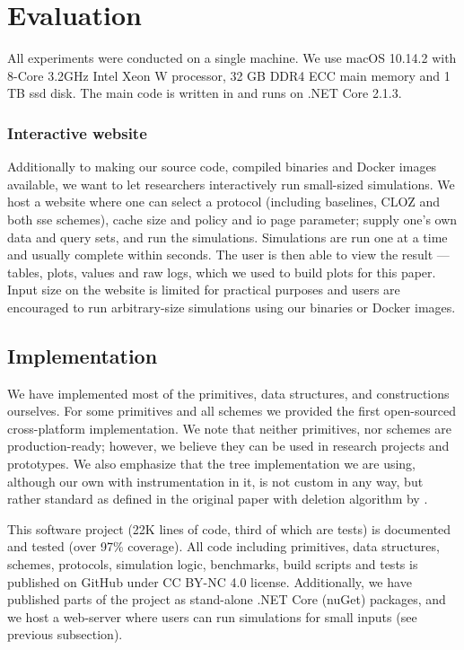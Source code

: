 \section{Evaluation}\label{section:range-snapshot:evaluation}

	All experiments were conducted on a single machine.
	We use macOS 10.14.2 with 8-Core 3.2GHz Intel Xeon W processor, 32 GB DDR4 ECC main memory and 1 TB \acrshort{ssd} disk.
	The main code is written in {\Csharp} and runs on {.NET Core 2.1.3}.

	\subsubsection*{Interactive website}\label{section:range-snapshot:website}

		Additionally to making our source code, compiled binaries and Docker images available, we want to let researchers interactively run small-sized simulations.
		We host a website \cite{ore-website} where one can select a protocol (including baselines, CLOZ and both \acrshort{sse} schemes), cache size and policy and \acrshort{io} page parameter; supply one's own data and query sets, and run the simulations.
		Simulations are run one at a time and usually complete within seconds.
		The user is then able to view the result --- tables, plots, values and raw logs, which we used to build plots for this paper.
		Input size on the website is limited for practical purposes and users are encouraged to run arbitrary-size simulations using our binaries or Docker images.

	\subsection{Implementation}

		We have implemented most of the primitives, data structures, and constructions ourselves.
		For some primitives and all schemes we provided the first open-sourced cross-platform {\Csharp} implementation.
		We note that neither primitives, nor schemes are production-ready; however, we believe they can be used in research projects and prototypes.
		We also emphasize that the {\BPlus} tree implementation we are using, although our own with instrumentation in it, is not custom in any way, but rather standard as defined in the original paper \cite{b-tree} with deletion algorithm by \cite{b-plus-tree-deletion}.

		This software project (22K lines of code, third of which are tests) is documented and tested (over 97\% coverage).
		All code including primitives, data structures, schemes, protocols, simulation logic, benchmarks, build scripts and tests is published on GitHub \cite{ore-project} under CC BY-NC 4.0 license.
		Additionally, we have published parts of the project as stand-alone {.NET Core} (nuGet) packages, and we host a web-server where users can run simulations for small inputs (see previous subsection).

